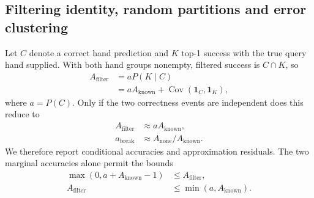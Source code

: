 \subsection{Filtering identity, random partitions and error clustering}
\label{sec:identity}
Let $C$ denote a correct hand prediction and $K$ top-1 success with the true query hand supplied. With both hand groups nonempty, filtered success is $C\cap K$, so
\begin{align}
 A_{\mathrm{filter}}&=aP(K\mid C)\nonumber\\
 &=aA_{\mathrm{known}}+\operatorname{Cov}(\mathbf1_C,\mathbf1_K),
 \label{eq:exact}
\end{align}
where $a=P(C)$. Only if the two correctness events are independent does this reduce to
\begin{equation}
 \begin{aligned}
 A_{\mathrm{filter}}&\approx aA_{\mathrm{known}},\\
 a_{\mathrm{break}}&\approx A_{\mathrm{none}}/A_{\mathrm{known}}.
 \end{aligned}
 \label{eq:approx}
\end{equation}
We therefore report conditional accuracies and approximation residuals. The two marginal accuracies alone permit the bounds
\begin{equation}
 \begin{aligned}
 \max(0,a+A_{\mathrm{known}}-1)&\leq A_{\mathrm{filter}},\\
 A_{\mathrm{filter}}&\leq\min(a,A_{\mathrm{known}}).
 \end{aligned}
 \label{eq:bounds}
\end{equation}

